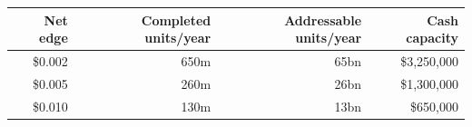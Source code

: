 \begin{tabular}{rrrr}
\toprule
Net edge & Completed units/year & Addressable units/year & Cash capacity \\
\midrule
\$0.002 & 650m & 65bn & \$3,250,000 \\
\$0.005 & 260m & 26bn & \$1,300,000 \\
\$0.010 & 130m & 13bn & \$650,000 \\
\bottomrule
\end{tabular}
